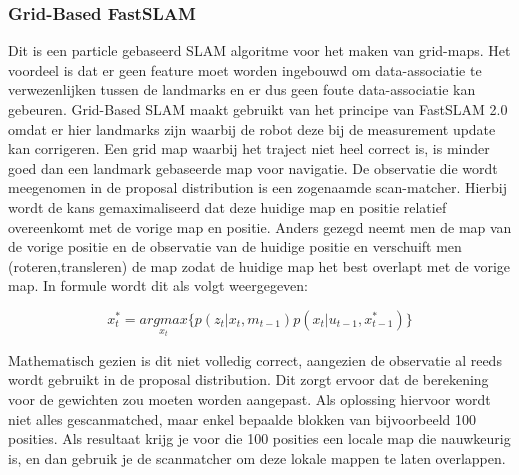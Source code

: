 \documentclass{book}
\begin{document}
\subsubsection{Grid-Based FastSLAM}
Dit is een particle gebaseerd SLAM algoritme voor het maken van grid-maps. Het voordeel is dat er geen feature moet worden ingebouwd om data-associatie te verwezenlijken tussen de landmarks en er dus geen foute data-associatie kan gebeuren. 
Grid-Based SLAM maakt gebruikt van het principe van FastSLAM 2.0 omdat er hier landmarks zijn waarbij de robot deze bij de measurement update kan corrigeren. Een grid map waarbij het traject niet heel correct is, is minder goed dan een landmark gebaseerde map voor navigatie.
De observatie die wordt meegenomen in de proposal distribution is een zogenaamde scan-matcher. Hierbij wordt de kans gemaximaliseerd dat deze huidige map en positie relatief overeenkomt met de vorige map en positie. Anders gezegd neemt men de map van de vorige positie en de observatie van de huidige positie en verschuift men (roteren,transleren) de map zodat de huidige map het best overlapt met de vorige map. In formule wordt dit als volgt weergegeven:

\begin{equation}
x_{t}^{*}=\underset{x_{t}}{argmax}\{p(z_{t}|x_{t},m_{t-1})p(x_{t}|u_{t-1},x_{t-1}^{*}) \}
\end{equation}

Mathematisch gezien is dit niet volledig correct, aangezien de observatie al reeds wordt gebruikt in de proposal distribution. Dit zorgt ervoor dat de berekening voor de gewichten zou moeten worden aangepast.
Als oplossing hiervoor wordt niet alles gescanmatched, maar enkel bepaalde blokken van bijvoorbeeld 100 posities. Als resultaat krijg je voor die 100 posities een locale map die nauwkeurig is, en dan gebruik je de scanmatcher om deze lokale mappen te laten overlappen.
\end{document}
